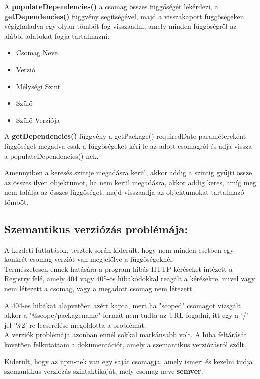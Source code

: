 \pagebreak

A \textbf{populateDependencies()} a csomag összes függőségét lekérdezi, a \textbf{getDependencies()} függvény segítségével, majd a visszakapott függőségeken végighaladva egy olyan tömböt fog visszaadni, amely minden függőségről az alábbi adatokat fogja tartalmazni:
\begin{itemize}
	\item Csomag Neve
	\item Verzió
	\item Mélységi Szint
	\item Szülő
	\item Szülő Verziója
\end{itemize}

A \textbf{getDependencies()} függvény a getPackage() requiredDate paramétereként függőséget megadva csak a függőségeket kéri le az adott csomagról és adja vissza a populateDependencies()-nek.

Amennyiben a keresés szintje megadásra kerül, akkor addig a szintig gyűjti össze az összes ilyen objektumot, ha nem kerül megadásra, akkor addig keres, amíg meg nem találja az összes függőséget, majd visszaadja az objektumokat tartalmazó tömböt.\\

\subsection{Szemantikus verziózás problémája:}

A kezdeti futtatások, tesztek során kiderült, hogy nem minden esetben egy konkrét csomag verziót van megjelölve a függőségeknél.\\

Természetesen ennek hatására a program hibás HTTP kéréseket intézett a Registry felé, amely 404 vagy 405-ös hibakódokkal reagált a kérésekre, mivel vagy nem létezett a csomag, vagy a megadott csomag nem létezett. 

A 404-es hibákat alapvetően azért kapta, mert ha "scoped" csomagot vizsgált akkor a "@scope/packagename" formát nem tudta az URL fogadni, itt egy a '/' jel '\%2'-re lecserélése megoldotta a problémát.\\

A verziók problémája azonban ennél sokkal markánsabb volt. A hiba feltárását követően felkutattam a dokumentációt, amely a szemantikus verziózásról szólt. 

Kiderült, hogy az npm-nek van egy saját csomagja, amely ismeri és kezelni tudja szemantikus verziózás szintaktikáját, mely csomag neve \textbf{semver}. 

